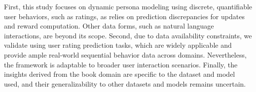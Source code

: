 First, this study focuses on dynamic persona modeling using discrete, quantifiable user behaviors, such as ratings, as \method relies on prediction discrepancies for updates and reward computation. Other data forms, such as natural language interactions, are beyond its scope. Second, due to data availability constraints, we validate \method using user rating prediction tasks, which are widely applicable and provide ample real-world sequential behavior data across domains. Nevertheless, the \method framework is adaptable to broader user interaction scenarios. Finally, the insights derived from the book domain are specific to the dataset and model used, and their generalizability to other datasets and models remains uncertain.